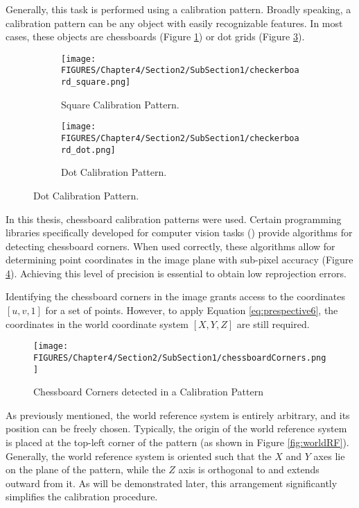 Generally, this task is performed using a calibration pattern. Broadly speaking, a calibration pattern can be any object with easily recognizable features. In most cases, these objects are chessboards (Figure \ref{fig:checkerboard_square}) or dot grids (Figure \ref{fig:checkerboard_dot}). 

 
\begin{figure}[htp]
  \centering
  \begin{subfigure}[b]{0.45\textwidth}
      \centering
      \texttt{[image: FIGURES/Chapter4/Section2/SubSection1/checkerboard\_square.png]}
      \caption{Square Calibration Pattern.}
      \label{fig:checkerboard_square}
  \end{subfigure}
  \hfill
  \begin{subfigure}[b]{0.45\textwidth}
      \centering
      \texttt{[image: FIGURES/Chapter4/Section2/SubSection1/checkerboard\_dot.png]}
      \caption{Dot Calibration Pattern.}
      \label{fig:checkerboard_dot}
  \end{subfigure}
\end{figure}

In this thesis, chessboard calibration patterns were used. Certain programming libraries specifically developed for computer vision tasks (\cite{opencv_website}) provide algorithms for detecting chessboard corners. When used correctly, these algorithms allow for determining point coordinates in the image plane with sub-pixel accuracy (Figure \ref{fig:chessboardCorners}). Achieving this level of precision is essential to obtain low reprojection errors.

Identifying the chessboard corners in the image grants access to the coordinates $[u, v, 1]$ for a set of points. However, to apply Equation \ref{eq:prespective6}, the coordinates in the world coordinate system $[X, Y, Z]$ are still required.

\begin{figure}[htbp]
  \centering
  \texttt{[image: FIGURES/Chapter4/Section2/SubSection1/chessboardCorners.png]} 
  \caption{Chessboard Corners detected in a Calibration Pattern} 
  \label{fig:chessboardCorners}  
\end{figure}

As previously mentioned, the world reference system is entirely arbitrary, and its position can be freely chosen. Typically, the origin of the world reference system is placed at the top-left corner of the pattern (as shown in Figure \ref{fig:worldRF}). Generally, the world reference system is oriented such that the $X$ and $Y$ axes lie on the plane of the pattern, while the $Z$ axis is orthogonal to and extends outward from it. As will be demonstrated later, this arrangement significantly simplifies the calibration procedure.

